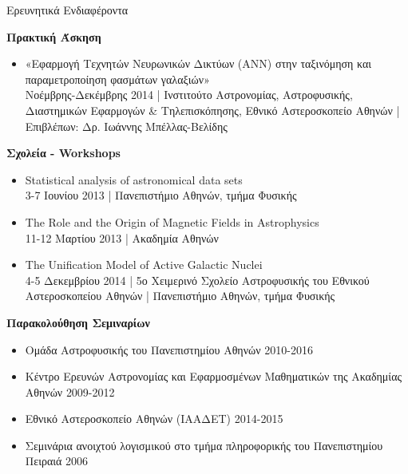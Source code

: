 \documentclass[a4paper,12pt,final]{memoir}
\newcommand{\SmallSep}{\vspace{0.25em}}
\newcommand{\CVSection}[1]
	{\Large{#1}\par
	\SmallSep\normalsize\normalfont}
\newcommand{\CVItem}[2]
	{\textbf{\color{RoyalBlue} #1} #2}
\newcommand{\location}[1]{ %
\small{\color{headings}#1}}
\newenvironment{tightitemize} %
{\vspace{-\topsep}\begin{itemize}\itemsep1pt \parskip0pt \parsep0pt}
{\end{itemize}\vspace{-\topsep}}
\begin{document}
\CVSection{Ερευνητικά Ενδιαφέροντα}
\CVItem{Πρακτική Άσκηση}{}
\begin{tightitemize}
	\item «Εφαρμογή Τεχνητών Νευρωνικών Δικτύων (ANN) στην ταξινόμηση και παραμετροποίηση φασμάτων γαλαξιών» \\
	\location{Νοέμβρης-Δεκέμβρης 2014 | Ινστιτούτο Αστρονομίας, Αστροφυσικής, Διαστημικών Εφαρμογών \& Τηλεπισκόπησης, Εθνικό Αστεροσκοπείο Αθηνών | Επιβλέπων: Δρ. Ιωάννης Μπέλλας-Βελίδης}
\end{tightitemize}
\CVItem{Σχολεία - Workshops}{}
\begin{tightitemize}
\item Statistical analysis of astronomical data sets \\
\location{3-7 Ιουνίου 2013 | Πανεπιστήμιο Αθηνών, τμήμα Φυσικής}
\item The Role and the Origin of Magnetic Fields in Astrophysics \\
\location{11-12 Μαρτίου 2013 | Ακαδημία Αθηνών}
\item The Unification Model of Active Galactic Nuclei \\
\location{4-5 Δεκεμβρίου 2014 | 5ο Χειμερινό Σχολείο Αστροφυσικής του Εθνικού Αστεροσκοπείου Αθηνών | Πανεπιστήμιο Αθηνών, τμήμα Φυσικής}
\end{tightitemize}
\SmallSep

\clearpage
\framebreak
\framebreak

\CVItem{Παρακολούθηση Σεμιναρίων}{}
\begin{tightitemize}
\item Ομάδα Αστροφυσικής του Πανεπιστημίου Αθηνών \location{2010-2016}
\item Κέντρο Ερευνών Αστρονομίας και Εφαρμοσμένων Μαθηματικών της Ακαδημίας Αθηνών \location{2009-2012}
\item Εθνικό Αστεροσκοπείο Αθηνών (ΙΑΑΔΕΤ) \location{2014-2015}
\item Σεμινάρια ανοιχτού λογισμικού στο τμήμα πληροφορικής του Πανεπιστημίου Πειραιά \location{2006}
\end{tightitemize}
\SmallSep


\end{document}
